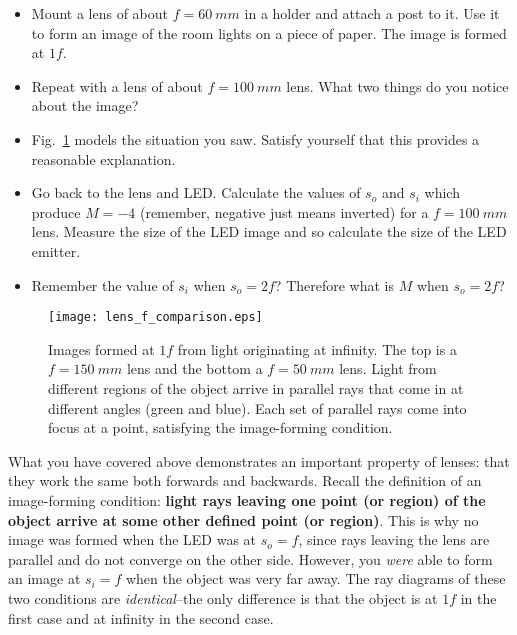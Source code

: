\documentclass[a4paper]{report}
\begin{document}
	\begin{itemize}
		\item Mount a lens of about $f=60~mm$ in a holder and attach a post to it. 
		Use it to form an image of the room lights on a piece of paper.
		The image is formed at $1f$.
		\item Repeat with a lens of about $f=100~mm$ lens. 
		What two things do you notice about the image? 
		\item Fig.~\ref{fig:outside} models the situation you saw. Satisfy yourself that this provides a reasonable explanation. 
		\item Go back to the lens and LED.
		Calculate the values of $s_o$ and $s_i$ which produce $M=-4$ (remember, negative just means inverted) for a $f=100~mm$ lens. 
		Measure the size of the LED image and so calculate the size of the LED emitter. 
		\item Remember the value of $s_i$ when $s_o=2f$? Therefore what is $M$ when $s_o=2f$?
	\end{itemize}
	
	
	\begin{figure}[h]
		\center
		\texttt{[image: lens\_f\_comparison.eps]}
		\caption{Images formed at $1f$ from light originating at infinity. 
			The top is a $f=150~mm$ lens and the bottom a $f=50~mm$ lens.
			Light from different regions of the object arrive in parallel rays that come in at different angles (green and blue). 
			Each set of parallel rays come into focus at a point, satisfying the image-forming condition. }
		\label{fig:outside}
	\end{figure}
	
	
	What you have covered above demonstrates an important property of lenses: that they work the same both forwards and backwards.
	Recall the definition of an image-forming condition: \textbf{light rays leaving one point (or region) of the object arrive at some other defined point (or region)}.
	This is why no image was formed when the LED was at $s_o=f$, since rays leaving the lens are parallel and do not converge on the other side. 
	However, you \textit{were} able to form an image at $s_i=f$ when the object was very far away. 
	The ray diagrams of these two conditions are \textit{identical}--the only difference is that the object is at $1f$ in the first case and at infinity in the second case.
	
	\clearpage
	
	
\end{document}

